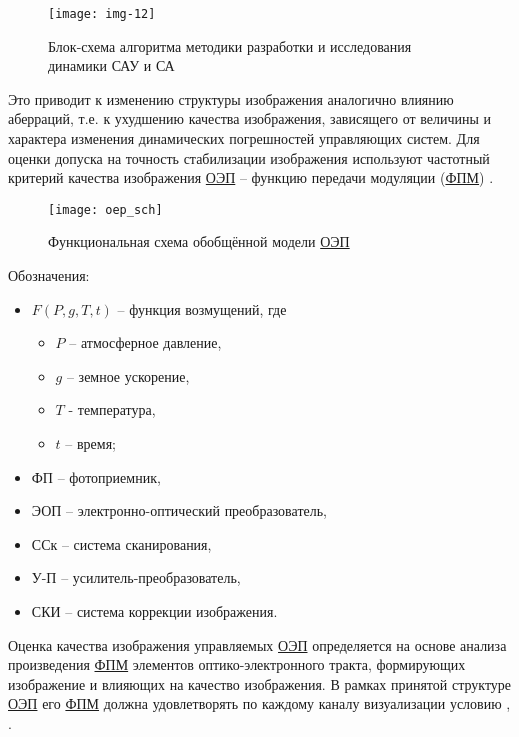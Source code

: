 \newpage

\begin{figure}[ht]
	\centering
	\texttt{[image: img-12]} 
	\caption{Блок-схема алгоритма методики разработки и исследования динамики САУ и СА}
	\label{fig:tikz_example}
\end{figure}


Это приводит к изменению структуры изображения аналогично влиянию аберраций, т.е. к ухудшению качества изображения, зависящего от величины и характера изменения динамических погрешностей управляющих систем. Для оценки допуска на точность стабилизации изображения используют частотный критерий качества изображения \hyperref[acroEOS]{ОЭП} – функцию передачи модуляции (\hyperref[acroFPM]{ФПМ}) \cite[]{Tarasov}.

\begin{figure}[ht]
	\centering
	\texttt{[image: oep\_sch]} 
	\caption{Функциональная схема обобщённой модели \hyperref[acroEOS]{ОЭП}}
	\label{fig:oep_sch}
\end{figure}

Обозначения: 
\begin{itemize}
	\item $F(P,g,T,t)$ – функция возмущений, где
	\begin{itemize}
		\item $P$ – атмосферное давление,
		\item $g$ – земное ускорение,
		\item $T$ - температура, 
		\item $t$ – время;
	\end{itemize}
	\item ФП – фотоприемник, 
	\item ЭОП – электронно-оптический преобразователь, 
	\item ССк – система сканирования, 
	\item У-П – усилитель-преобразователь, 
	\item СКИ – система коррекции изображения.
\end{itemize}

Оценка качества изображения управляемых \hyperref[acroEOS]{ОЭП} определяется на основе анализа произведения \hyperref[acroFPM]{ФПМ} элементов оптико-электронного тракта, формирующих изображение и влияющих на качество изображения. В рамках принятой структуре \hyperref[acroEOS]{ОЭП} его \hyperref[acroFPM]{ФПМ} должна удовлетворять по каждому каналу визуализации условию \cite[]{Ivanov18}, \cite[]{Molin21}.

